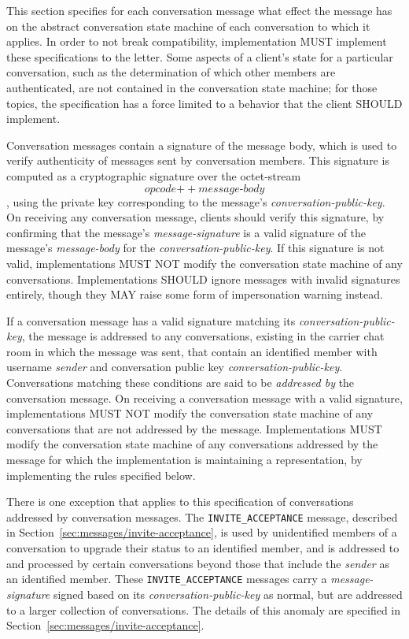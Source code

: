 \documentclass{article}
\def\npmessage#1{\texttt{#1}}
\def\field#1{\textit{#1}}
\def\concat{\mathbin{+\!\!\!+}}
\begin{document}
This section specifies for each conversation message what effect the message has on the abstract conversation state machine of each conversation to which it applies.
In order to not break compatibility, implementation MUST implement these specifications to the letter.
Some aspects of a client's state for a particular conversation, such as the determination of which other members are authenticated, are not contained in the conversation state machine; for those topics, the specification has a force limited to a behavior that the client SHOULD implement.

Conversation messages contain a signature of the message body, which is used to verify authenticity of messages sent by conversation members.
This signature is computed as a cryptographic signature over the octet-stream
$$\field{opcode} \concat \field{message-body}$$
, using the private key corresponding to the message's \field{conversation-public-key}.
On receiving any conversation message, clients should verify this signature, by confirming that the message's \field{message-signature} is a valid signature of the message's \field{message-body} for the \field{conversation-public-key}.
If this signature is not valid, implementations MUST NOT modify the conversation state machine of any conversations.
Implementations SHOULD ignore messages with invalid signatures entirely, though they MAY raise some form of impersonation warning instead.

If a conversation message has a valid signature matching its \field{conversation-public-key}, the message is addressed to any conversations, existing in the carrier chat room in which the message was sent, that contain an identified member with username \field{sender} and conversation public key \field{conversation-public-key}.
Conversations matching these conditions are said to be \emph{addressed by} the conversation message.
On receiving a conversation message with a valid signature, implementations MUST NOT modify the conversation state machine of any conversations that are not addressed by the message.
Implementations MUST modify the conversation state machine of any conversations addressed by the message for which the implementation is maintaining a representation, by implementing the rules specified below.

There is one exception that applies to this specification of conversations addressed by conversation messages.
The \npmessage{INVITE\_ACCEPTANCE} message, described in Section~\ref{sec:messages/invite-acceptance}, is used by unidentified members of a conversation to upgrade their status to an identified member, and is addressed to and processed by certain conversations beyond those that include the \field{sender} as an identified member.
These \npmessage{INVITE\_ACCEPTANCE} messages carry a \field{message-signature} signed based on its \field{conversation-public-key} as normal, but are addressed to a larger collection of conversations.
The details of this anomaly are specified in Section~\ref{sec:messages/invite-acceptance}.
\end{document}
